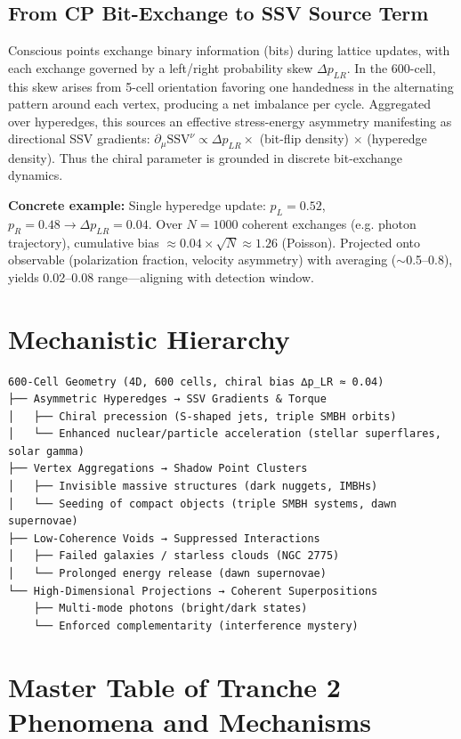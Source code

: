 \documentclass[11pt]{article}
\begin{document}
\subsection{From CP Bit-Exchange to SSV Source Term}
Conscious points exchange binary information (bits) during lattice updates, with each exchange governed by a left/right probability skew $\Delta p_{LR}$. In the 600-cell, this skew arises from 5-cell orientation favoring one handedness in the alternating pattern around each vertex, producing a net imbalance per cycle. Aggregated over hyperedges, this sources an effective stress-energy asymmetry manifesting as directional SSV gradients: $\partial_\mu \text{SSV}^\nu \propto \Delta p_{LR} \times$ (bit-flip density) $\times$ (hyperedge density). Thus the chiral parameter is grounded in discrete bit-exchange dynamics.

\textbf{Concrete example:} Single hyperedge update: $p_L = 0.52$, $p_R = 0.48 \to \Delta p_{LR} = 0.04$. Over $N = 1000$ coherent exchanges (e.g. photon trajectory), cumulative bias $\approx 0.04 \times \sqrt{N} \approx 1.26$ (Poisson). Projected onto observable (polarization fraction, velocity asymmetry) with averaging ($\sim$0.5--0.8), yields 0.02--0.08 range—aligning with detection window.

\section{Mechanistic Hierarchy}
\begin{verbatim}
600-Cell Geometry (4D, 600 cells, chiral bias ∆p_LR ≈ 0.04)
├── Asymmetric Hyperedges → SSV Gradients & Torque
│   ├── Chiral precession (S-shaped jets, triple SMBH orbits)
│   └── Enhanced nuclear/particle acceleration (stellar superflares, solar gamma)
├── Vertex Aggregations → Shadow Point Clusters
│   ├── Invisible massive structures (dark nuggets, IMBHs)
│   └── Seeding of compact objects (triple SMBH systems, dawn supernovae)
├── Low-Coherence Voids → Suppressed Interactions
│   ├── Failed galaxies / starless clouds (NGC 2775)
│   └── Prolonged energy release (dawn supernovae)
└── High-Dimensional Projections → Coherent Superpositions
    ├── Multi-mode photons (bright/dark states)
    └── Enforced complementarity (interference mystery)
\end{verbatim}

\section{Master Table of Tranche 2 Phenomena and Mechanisms}
\end{document}
